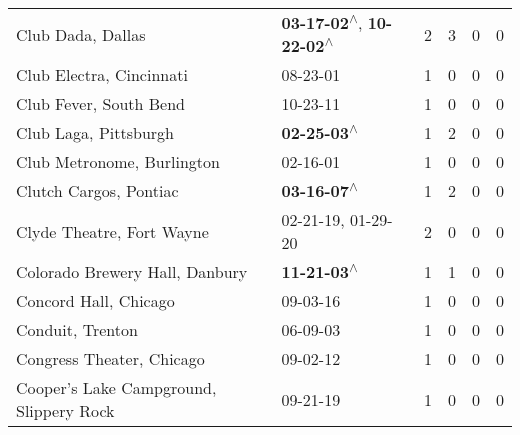 \begin{supertabular}{p{0.4\textwidth}p{0.3\textwidth}p{0.05\textwidth}p{0.05\textwidth}p{0.05\textwidth}p{0.05\textwidth}}
                                                            Club Dada, Dallas &    \textbf{03-17-02\textsuperscript{$\wedge$}}, \textbf{10-22-02\textsuperscript{$\wedge$}} &  2 &  3 &  0 &  0 \\
                                                     Club Electra, Cincinnati &                                                                  08-23-01\textsuperscript{} &  1 &  0 &  0 &  0 \\
                                                       Club Fever, South Bend &                                                                  10-23-11\textsuperscript{} &  1 &  0 &  0 &  0 \\
                                                        Club Laga, Pittsburgh &                                                 \textbf{02-25-03\textsuperscript{$\wedge$}} &  1 &  2 &  0 &  0 \\
                                                   Club Metronome, Burlington &                                                                  02-16-01\textsuperscript{} &  1 &  0 &  0 &  0 \\
                                                       Clutch Cargos, Pontiac &                                                 \textbf{03-16-07\textsuperscript{$\wedge$}} &  1 &  2 &  0 &  0 \\
                                                    Clyde Theatre, Fort Wayne &                                      02-21-19\textsuperscript{}, 01-29-20\textsuperscript{} &  2 &  0 &  0 &  0 \\
                                               Colorado Brewery Hall, Danbury &                                                 \textbf{11-21-03\textsuperscript{$\wedge$}} &  1 &  1 &  0 &  0 \\
                                                        Concord Hall, Chicago &                                                                  09-03-16\textsuperscript{} &  1 &  0 &  0 &  0 \\
                                                             Conduit, Trenton &                                                                  06-09-03\textsuperscript{} &  1 &  0 &  0 &  0 \\
                                                    Congress Theater, Chicago &                                                                  09-02-12\textsuperscript{} &  1 &  0 &  0 &  0 \\
                                      Cooper's Lake Campground, Slippery Rock &                                                                  09-21-19\textsuperscript{} &  1 &  0 &  0 &  0 \\

\end{supertabular}
